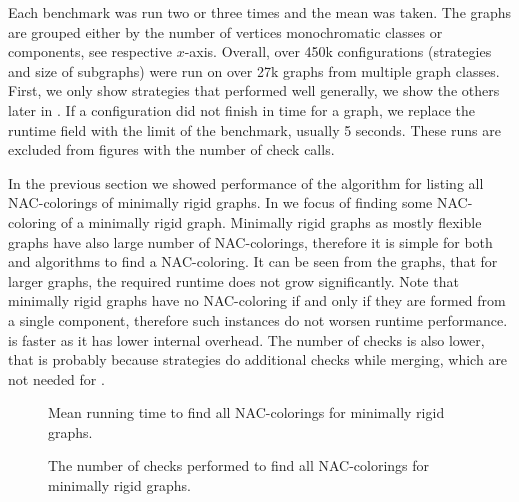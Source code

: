 Each benchmark was run two or three times and the mean was taken.
The graphs are grouped either by the number of vertices
monochromatic classes or \trcon{} components, see respective \(x\)-axis.
Overall, over 450k configurations (strategies and size of subgraphs) were run
on over 27k graphs from multiple graph classes.
%
First, we only show strategies that performed well generally,
we show the others later in .
If a configuration did not finish in time for a graph,
we replace the runtime field with the limit of the benchmark, usually 5 seconds.
These runs are excluded from figures with the number of check calls.

In the previous section we showed performance of the algorithm for listing
all NAC-colorings of minimally rigid graphs.
%
In 
we focus of finding some NAC-coloring of a minimally rigid graph.
%
Minimally rigid graphs as mostly flexible graphs have also
large number of NAC-colorings, therefore it is simple for both \NaiveCycles{}
and \Subgraphs{} algorithms to find a NAC-coloring.
%
It can be seen from the graphs, that for larger graphs, the required runtime
does not grow significantly.
%
Note that minimally rigid graphs have no NAC-coloring if and only if they are formed from
a single \trcon{} component, therefore such instances do not worsen runtime performance.
%
\NaiveCycles{} is faster as it has lower internal overhead.
The number of \IsNACColoring{} checks is also lower,
that is probably because \Subgraphs{} strategies do additional checks
while merging, which are not needed for \NaiveCycles{}.

\begin{figure}[p]
	\centering
	\scalebox{0.5}{}
	\caption[Mean runtime for minimally rigid graphs (some).]{
		Mean running time to find all NAC-colorings for minimally rigid graphs.}%
	\label{fig:graph_minimally_rigid_first_runtime}
\end{figure}%
\begin{figure}[p]
	\centering
	\scalebox{0.5}{}
	\caption[Checks performed for minimally rigid graphs (some).]{
		The number of checks performed to find all NAC-colorings for minimally rigid graphs.}%
	\label{fig:graph_minimally_rigid_first_checks}
\end{figure}%


